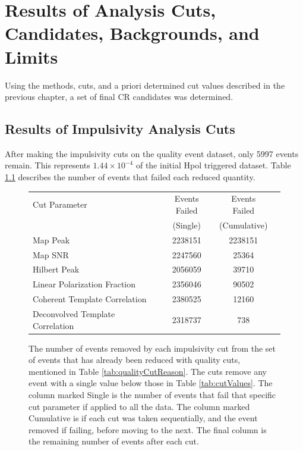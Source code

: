 			
\chapter{Results of Analysis Cuts, Candidates, Backgrounds, and Limits}
	Using the methods, cuts, and a priori determined cut values described in the previous chapter, a set of final CR candidates was determined.

\section{Results of Impulsivity Analysis Cuts}
		After making the impulsivity cuts on the quality event dataset, only 5997 events remain.  This represents $1.44\times10^{-4}$ of the initial Hpol triggered dataset.  Table \ref{tab:weakCutReason} describes the number of events that failed each reduced quantity.
		
		\begin{figure}
		\centering
		\begin{tabular}[c]{|l|c|c|c|}
		\hline
		Cut Parameter & Events Failed & Events Failed \\
		 & (Single) &  (Cumulative) \\
		\hline
		Map Peak & 2238151 & 2238151 \\
		Map SNR & 2247560 & 25364    \\
		Hilbert Peak & 2056059 & 39710    \\
		Linear Polarization Fraction & 2356046 & 90502   \\
		Coherent Template Correlation & 2380525	& 12160    \\
		Deconvolved Template Correlation & 2318737 & 738	   \\
		\hline
		\end{tabular}
		\caption{The number of events removed by each impulsivity cut from the set of events that has already been reduced with quality cuts, mentioned in Table \ref{tab:qualityCutReason}.  The cuts remove any event with a single value below those in Table \ref{tab:cutValues}.  The column marked Single is the number of events that fail that specific cut parameter if applied to all the data.  The column marked Cumulative is if each cut was taken sequentially, and the event removed if failing, before moving to the next.  The final column is the remaining number of events after each cut.}
		\label{tab:weakCutReason}
		\end{figure}
		

